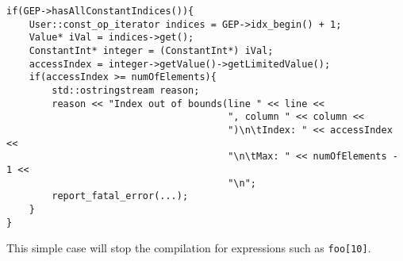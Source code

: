 \documentclass{report}
\begin{document}
\begin{lstlisting}
if(GEP->hasAllConstantIndices()){
	User::const_op_iterator indices = GEP->idx_begin() + 1;
	Value* iVal = indices->get();
	ConstantInt* integer = (ConstantInt*) iVal;
	accessIndex = integer->getValue()->getLimitedValue();
	if(accessIndex >= numOfElements){
		std::ostringstream reason;
		reason << "Index out of bounds(line " << line << 
		                               ", column " << column <<
		                               ")\n\tIndex: " << accessIndex << 
		                               "\n\tMax: " << numOfElements - 1 <<
		                               "\n";
		report_fatal_error(...);
	}
}
\end{lstlisting}
This simple case will stop the compilation for expressions such as \texttt{foo[10]}. 
\end{document}
